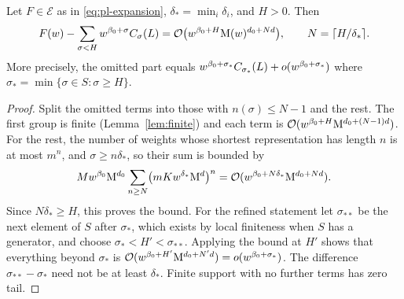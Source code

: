 \begin{lemma}
\label{lem:tail}
Let $F\in\mathcal E$ as in \eqref{eq:pl-expansion}, $\delta_*=\min_i\delta_i$, and $H>0$. Then
\begin{equation}
 F(w)-\sum_{\sigma<H}w^{\beta_0+\sigma}C_\sigma(L)=\mathcal O\bigl(w^{\beta_0+H}\mathrm M(w)^{d_0+Nd}\bigr),\qquad N=\lceil H/\delta_*\rceil.
 \label{eq:tail}
\end{equation}
More precisely, the omitted part equals $w^{\beta_0+\sigma_*}C_{\sigma_*}(L)+o(w^{\beta_0+\sigma_*})$ where $\sigma_*=\min\{\sigma\in S:\sigma\ge H\}$.
\end{lemma}
\begin{proof}
Split the omitted terms into those with $n(\sigma)\le N-1$ and the rest. The first group is finite (Lemma~\ref{lem:finite}) and each term is $\mathcal O(w^{\beta_0+H}\mathrm M^{d_0+(N-1)d})$. For the rest, the number of weights whose shortest representation has length $n$ is at most $m^n$, and $\sigma\ge n\delta_*$, so their sum is bounded by
\[
 Mw^{\beta_0}\mathrm M^{d_0}\sum_{n\ge N}\bigl(mKw^{\delta_*}\mathrm M^d\bigr)^n
 =\mathcal O(w^{\beta_0+N\delta_*}\mathrm M^{d_0+Nd}).
\]
Since $N\delta_*\ge H$, this proves the bound. For the refined statement let $\sigma_{**}$ be the next element of $S$ after $\sigma_*$, which exists by local finiteness when $S$ has a generator, and choose $\sigma_*<H'<\sigma_{**}$. Applying the bound at $H'$ shows that everything beyond $\sigma_*$ is $\mathcal O(w^{\beta_0+H'}\mathrm M^{d_0+N'd})=o(w^{\beta_0+\sigma_*})$. The difference $\sigma_{**}-\sigma_*$ need not be at least $\delta_*$. Finite support with no further terms has zero tail.
\end{proof}

